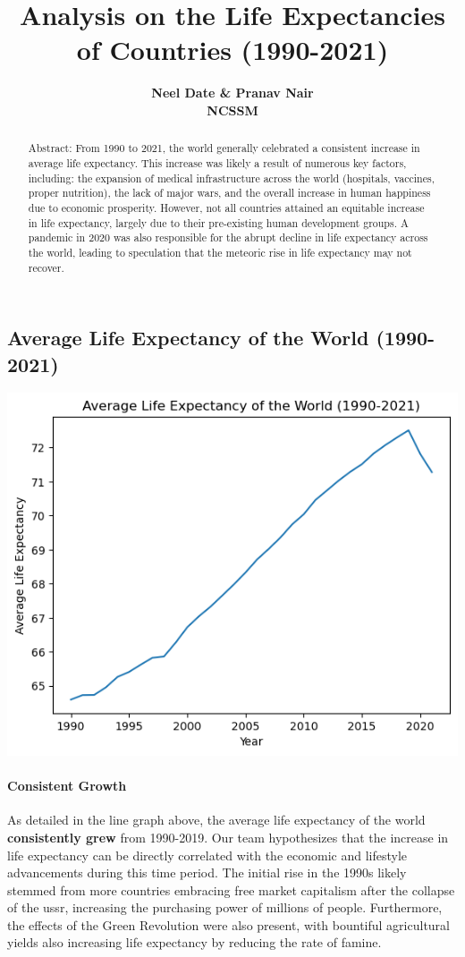 \documentclass{article}
\title{Analysis on the Life Expectancies of Countries (1990-2021)}
\date{\displaydate{articleDate}}
\author{\bfseries Neel Date & Pranav Nair\mdseries\\NCSSM\\}
\begin{document}
\maketitle
\begin{abstract}
Abstract: From 1990 to 2021, the world generally celebrated a consistent increase in average life expectancy. This increase was likely a result of numerous key factors, including: the expansion of medical infrastructure across the world (hospitals, vaccines, proper nutrition), the lack of major wars, and the overall increase in human happiness due to economic prosperity. However, not all countries attained an equitable increase in life expectancy, largely due to their pre-existing human development groups. A pandemic in 2020 was also responsible for the abrupt decline in life expectancy across the world, leading to speculation that the meteoric rise in life expectancy may not recover.
\end{abstract}\keywords{}

\subsection{Average Life Expectancy of the World (1990-2021)}

\includegraphics[width=0.7\linewidth]{files/8bb61c83fe12eb8d09a4741f1470b91f.png}

\paragraph{Consistent Growth}

As detailed in the line graph above, the average life expectancy of the world \textbf{consistently grew} from 1990-2019. Our team hypothesizes that the increase in life expectancy can be directly correlated with the economic and lifestyle advancements during this time period. The initial rise in the 1990s likely stemmed from more countries embracing free market capitalism after the collapse of the \acrshort{ussr}, increasing the purchasing power of millions of people. Furthermore, the effects of the Green Revolution were also present, with bountiful agricultural yields also increasing life expectancy by reducing the rate of famine.
\end{document}
